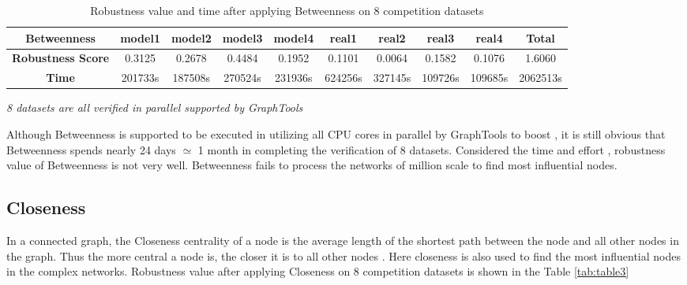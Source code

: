 \documentclass{article}
\begin{document}
	
	\begin{table}[!htbp]
	\small\begin{adjustwidth}{-1.3cm}{}		
		\begin{threeparttable}
			\centering
			\caption{Robustness value and time after applying Betweenness on 8 competition datasets}
			\label{tab:table2}
		
			\begin{tabular}{|c|c|c|c|c|c|c|c|c|c|}
				\hline
				\textbf{Betweenness}          & \textbf{model1} & \textbf{model2} & \textbf{model3} & \textbf{model4} & \textbf{real1} & \textbf{real2} & \textbf{real3} & \textbf{real4} & \textbf{Total} \\ \hline
				\textbf{Robustness Score} & 0.3125          & 0.2678          & 0.4484          & 0.1952          & 0.1101         & 0.0064         & 0.1582         & 0.1076         & 1.6060         \\ \hline
				\textbf{Time}     & 201733s          & 187508s          & 270524s          & 231936s         & 624256s         & 327145s         & 109726s         & 109685s         & 2062513s        \\ \hline
			\end{tabular}
				\begin{tablenotes}
					\small
					\item\textit{8 datasets are all verified in parallel supported by GraphTools \cite{peixotographtool2014}}
				\end{tablenotes}			
	 	\end{threeparttable}
	\end{adjustwidth}
\end{table}
	
	
	Although Betweenness is supported to be executed in utilizing all CPU cores in parallel by GraphTools \cite{peixotographtool2014} to boost , it is still obvious that Betweenness spends nearly 24 days $\simeq$ 1 month in completing the verification of 8 datasets. Considered the time and effort , robustness value of Betweenness is not very well. Betweenness fails to process the networks of million scale to find most influential nodes.
	
	\subsection{Closeness}	
	
	
	In a connected graph, the Closeness centrality of a node is the average length of the shortest path between the node and all other nodes in the graph. Thus the more central a node is, the closer it is to all other nodes \cite{wikiClosenesscentrality}\cite{bavelas1950communication} . Here closeness is also used to find the most influential nodes in the complex networks. Robustness value after applying Closeness on 8 competition datasets is shown in the Table \ref{tab:table3}
	
\end{document}
